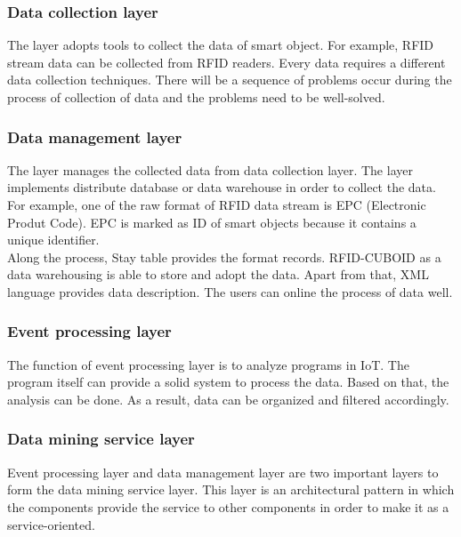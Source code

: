 \documentclass[a4paper,12pt]{article}
\begin{document}
{\subsubsection{Data collection layer}
The layer adopts tools to collect the data of smart object. For example, RFID stream data can be collected from RFID readers. Every data requires a different data collection techniques. There will be a sequence of problems occur during the process of collection of data and the  problems need to be well-solved. 
\subsubsection{Data management layer}
The layer manages the collected data from data collection layer. The layer implements distribute database or data warehouse in order to collect the data. For example, one of the raw format of RFID data stream is EPC (Electronic Produt Code). EPC is marked as ID of smart objects because it contains a unique identifier.\\
\indent
Along the process, Stay table provides the format records. RFID-CUBOID as a data warehousing is able to store and adopt the data. Apart from that, XML language provides data description. The users can online the process of data well.
\subsubsection{Event processing layer}
The function of event processing layer is to analyze programs in IoT. The program itself can provide a solid system to process the data. Based on that, the analysis can be done. As a result, data can be organized and filtered accordingly. 
\subsubsection{Data mining service layer} 
Event processing layer and data management layer are two important layers to form the data mining service layer. This layer is an architectural pattern in which the components provide the service to other components in order to make it as a service-oriented.
}
\end{document}
